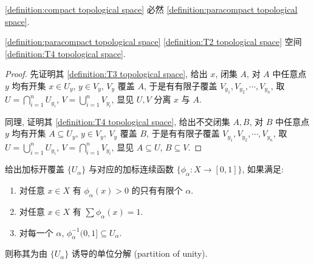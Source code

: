 \begin{corollary}
    \ref{definition:compact topological space} 必然 \ref{definition:paracompact topological space}.
\end{corollary}

\begin{lemma}
    \ref{definition:paracompact topological space} \ref{definition:T2 topological space} 空间 \ref{definition:T4 topological space}.

    \begin{proof}
        先证明其 \ref{definition:T3 topological space}, 给出 \(x\), 闭集 \(A\), 对 \(A\) 中任意点 \(y\) 均有开集 \(x \in U_y\), \(y \in V_y\), \(V_y\) 覆盖 \(A\), 于是有有限子覆盖 \(V_{y_1}, V_{y_2}, \cdots, V_{y_n}\),
        取 \(U = \bigcap_{i = 1}^n U_{y_i}\), \(V = \bigcup_{i = 1}^n V_{y_i}\), 显见 \(U,V\) 分离 \(x\) 与 \(A\).

        同理, 证明其 \ref{definition:T4 topological space}, 给出不交闭集 \(A,B\), 对 \(B\) 中任意点 \(y\) 均有开集 \(A \subseteq U_y\), \(y \in V_y\), \(V_y\) 覆盖 \(B\),
        于是有有限子覆盖 \(V_{y_1}, V_{y_2}, \cdots, V_{y_n}\), 取 \(U = \bigcup_{i = 1}^n U_{y_i}\), \(V = \bigcap_{i = 1}^n V_{y_i}\), 显见 \(A \subseteq U\), \(B \subseteq V\).
    \end{proof}
\end{lemma}

\begin{definition}[单位分解]
    给出加标开覆盖 \(\{U_\alpha\}\) 与对应的加标连续函数 \(\{\phi_\alpha : X \to [0,1]\}\),
    如果满足:

    \begin{enumerate}
        \item 对任意 \(x \in X\) 有 \(\phi_\alpha (x) > 0\) 的只有有限个 \(\alpha\).
        \item 对任意 \(x \in X\) 有 \(\sum \phi_\alpha (x) = 1\).
        \item 对每一个 \(\alpha\), \(\phi_\alpha^{-1} (0,1] \subseteq U_\alpha\).
    \end{enumerate}

    则称其为由 \(\{U_\alpha\}\) 诱导的单位分解 (partition of unity).
\end{definition}

